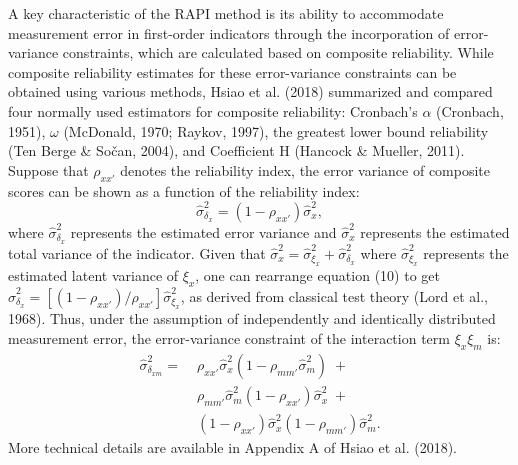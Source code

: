 \documentclass[
  man]{apa6}
\begin{document}
A key characteristic of the RAPI method is its ability to accommodate measurement error in first-order indicators through the incorporation of error-variance constraints, which are calculated based on composite reliability. While composite reliability estimates for these error-variance constraints can be obtained using various methods, Hsiao et al. (2018) summarized and compared four normally used estimators for composite reliability: Cronbach's \(\alpha\) (Cronbach, 1951), \(\omega\) (McDonald, 1970; Raykov, 1997), the greatest lower bound reliability (Ten Berge \& Sočan, 2004), and Coefficient H (Hancock \& Mueller, 2011). Suppose that \(\rho_{xx'}\) denotes the reliability index, the error variance of composite scores can be shown as a function of the reliability index:
\begin{equation}
\hat{\sigma}^2_{\delta_{x}} = (1 - \rho_{xx'})\hat{\sigma}^2_{{x}},
\end{equation}
where \(\hat{\sigma}^2_{\delta_{x}}\) represents the estimated error variance and \(\hat{\sigma}^2_{{x}}\) represents the estimated total variance of the indicator. Given that \(\hat{\sigma}^2_{{x}} = {\hat{\sigma}^2_{\xi_{x}} + \hat{\sigma}^2_{\delta_{x}}}\) where \(\hat{\sigma}^2_{\xi_{x}}\) represents the estimated latent variance of \(\xi_{x}\), one can rearrange equation (10) to get \(\hat{\sigma}_{\delta_{x}}^2 = [(1 - \rho_{xx'})/{\rho_{xx'}}]\hat{\sigma}^2_{\xi_{x}}\), as derived from classical test theory (Lord et al., 1968). Thus, under the assumption of independently and identically distributed measurement error, the error-variance constraint of the interaction term \(\xi_{x}\xi_{m}\) is:
\begin{equation}
\begin{aligned}
\hat{\sigma}^2_{\delta_{xm}} =\; & \rho_{xx'}\hat{\sigma}^2_{{x}}(1 - \rho_{mm'}\hat{\sigma}^2_{{m}})\; + \\&
                        \rho_{mm'}\hat{\sigma}^2_{{m}}(1-\rho_{xx'})\hat{\sigma}^2_{{x}}\; + \\&
                        (1 - \rho_{xx'})\hat{\sigma}^2_{{x}}(1 - \rho_{mm'})\hat{\sigma}^2_{{m}}. 
\end{aligned}
\end{equation}
More technical details are available in Appendix A of Hsiao et al. (2018).
\end{document}
